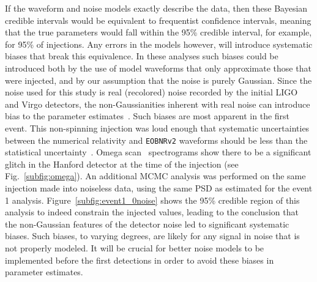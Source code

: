 \documentclass[12pt]{iopart}
\newcommand{\eob}{\texttt{EOBNRv2}\xspace}
\begin{document}
If the waveform and noise models exactly describe the data, then these Bayesian
credible intervals would be equivalent to frequentist confidence intervals,
meaning that the true parameters would fall within the 95\% credible interval,
for example, for 95\% of injections.  Any errors in the models however,
will introduce systematic biases that break this equivalence.  In these
analyses such biases could be introduced both by the use of model waveforms
that only approximate those that were injected, and by our assumption that the
noise is purely Gaussian.  Since the noise used for this study is real
(recolored) noise recorded by the initial LIGO and Virgo detectors, the
non-Gaussianities inherent with real noise can introduce bias to the parameter
estimates~\cite{Aasi:2013jjl}.  Such biases are most apparent in the first
event.  This non-spinning injection was loud enough that systematic
uncertainties between the numerical relativity and \eob waveforms should be
less than the statistical uncertainty~\cite{Littenberg:2012uj}.  Omega
scan~\cite{Isogai:2010zz} spectrograms show there to be a significant glitch in
the Hanford detector at the time of the injection (see
Fig.~\ref{subfig:omega}).  An additional MCMC analysis was performed on the same
injection made into noiseless data, using the same PSD as estimated for the
event 1 analysis.  Figure~\ref{subfig:event1_0noise} shows the 95\% credible
region of this analysis to indeed constrain the injected values, leading to the
conclusion that the non-Gaussian features of the detector noise led to
significant systematic biases.  Such biases, to varying degrees, are likely for
any signal in noise that is not properly modeled.  It will be crucial for
better noise models to be implemented before the first detections in order to
avoid these biases in parameter estimates.
\end{document}
